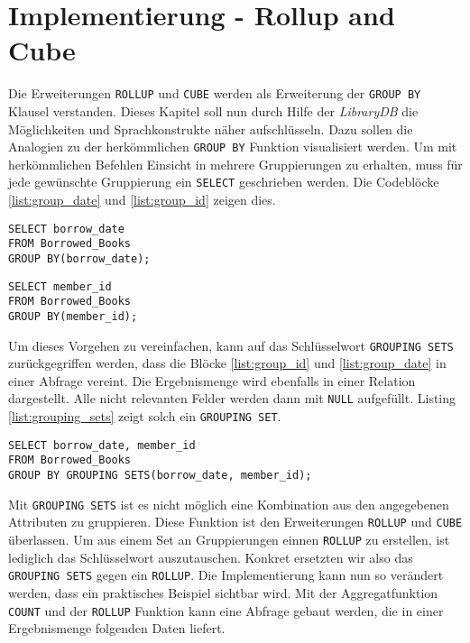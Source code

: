 \section{Implementierung - Rollup and Cube}
\label{sec:implementierung_rollup_and_cube} Die Erweiterungen \texttt{ROLLUP} und
\texttt{CUBE} werden als Erweiterung der \texttt{GROUP BY} Klausel verstanden.
Dieses Kapitel soll nun durch Hilfe der \textit{LibraryDB} die Möglichkeiten und
Sprachkonstrukte näher aufschlüsseln. Dazu sollen die Analogien zu der
herkömmlichen \texttt{GROUP BY} Funktion visualisiert werden. Um mit
herkömmlichen Befehlen Einsicht in mehrere Gruppierungen zu erhalten, muss für jede
gewünschte Gruppierung ein \texttt{SELECT} geschrieben werden. Die Codeblöcke \ref{list:group_date}
und \ref{list:group_id} zeigen dies.

\begin{minipage}{0.45\textwidth}
	 \begin{lstlisting}
SELECT borrow_date
FROM Borrowed_Books
GROUP BY(borrow_date);
	\end{lstlisting}
\end{minipage}
\hfill
\begin{minipage}{0.45\textwidth}
	 \begin{lstlisting}
SELECT member_id
FROM Borrowed_Books
GROUP BY(member_id);
	\end{lstlisting}
\end{minipage}

Um dieses Vorgehen zu vereinfachen, kann auf das Schlüsselwort \texttt{GROUPING
SETS} zurückgegriffen werden, dass die Blöcke \ref{list:group_id} und \ref{list:group_date}
in einer Abfrage vereint. Die Ergebnismenge wird ebenfalls in einer Relation
dargestellt. Alle nicht relevanten Felder werden dann mit \texttt{NULL}
aufgefüllt. Listing \ref{list:grouping_sets} zeigt solch ein \texttt{GROUPING
SET}.

\begin{lstlisting}[caption={Beispiel eines \texttt{GROUPING SETS}}, label={list:grouping_sets}]
SELECT borrow_date, member_id
FROM Borrowed_Books
GROUP BY GROUPING SETS(borrow_date, member_id);
\end{lstlisting}

Mit \texttt{GROUPING SETS} ist es nicht möglich eine Kombination aus den
angegebenen Attributen zu gruppieren. Diese Funktion ist den Erweiterungen \texttt{ROLLUP}
und \texttt{CUBE} überlassen. Um aus einem Set an Gruppierungen einnen \texttt{ROLLUP}
zu erstellen, ist lediglich das Schlüsselwort auszutauschen. Konkret ersetzten wir
also das \texttt{GROUPING SETS} gegen ein \texttt{ROLLUP}. Die Implementierung
kann nun so verändert werden, dass ein praktisches Beispiel sichtbar wird. Mit
der Aggregatfunktion \texttt{COUNT} und der \texttt{ROLLUP} Funktion kann eine
Abfrage gebaut werden, die in einer Ergebnismenge folgenden Daten liefert.

